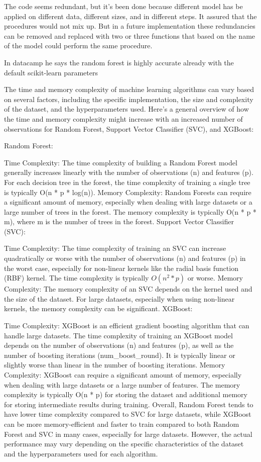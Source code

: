 \documentclass[12pt,a4paper]{article}
\begin{document}
The code seems redundant, but it's been done because different model has be applied on different data, different sizes, and in different steps. It assured that the procedures would not mix up. But in a future implementation these redundancies can be removed and replaced with two or three functions that based on the name of the model could perform the same procedure.

In datacamp he says the random forest is highly accurate already with the default scikit-learn parameters


The time and memory complexity of machine learning algorithms can vary based on several factors, including the specific implementation, the size and complexity of the dataset, and the hyperparameters used. Here's a general overview of how the time and memory complexity might increase with an increased number of observations for Random Forest, Support Vector Classifier (SVC), and XGBoost:

Random Forest:

Time Complexity: The time complexity of building a Random Forest model generally increases linearly with the number of observations (n) and features (p). For each decision tree in the forest, the time complexity of training a single tree is typically O(n * p * log(n)).
Memory Complexity: Random Forests can require a significant amount of memory, especially when dealing with large datasets or a large number of trees in the forest. The memory complexity is typically O(n * p * m), where m is the number of trees in the forest.
Support Vector Classifier (SVC):

Time Complexity: The time complexity of training an SVC can increase quadratically or worse with the number of observations (n) and features (p) in the worst case, especially for non-linear kernels like the radial basis function (RBF) kernel. The time complexity is typically $O(n^2 * p)$ or worse.
Memory Complexity: The memory complexity of an SVC depends on the kernel used and the size of the dataset. For large datasets, especially when using non-linear kernels, the memory complexity can be significant.
XGBoost:

Time Complexity: XGBoost is an efficient gradient boosting algorithm that can handle large datasets. The time complexity of training an XGBoost model depends on the number of observations (n) and features (p), as well as the number of boosting iterations (num\_boost\_round). It is typically linear or slightly worse than linear in the number of boosting iterations.
Memory Complexity: XGBoost can require a significant amount of memory, especially when dealing with large datasets or a large number of features. The memory complexity is typically O(n * p) for storing the dataset and additional memory for storing intermediate results during training.
Overall, Random Forest tends to have lower time complexity compared to SVC for large datasets, while XGBoost can be more memory-efficient and faster to train compared to both Random Forest and SVC in many cases, especially for large datasets. However, the actual performance may vary depending on the specific characteristics of the dataset and the hyperparameters used for each algorithm.
\end{document}
